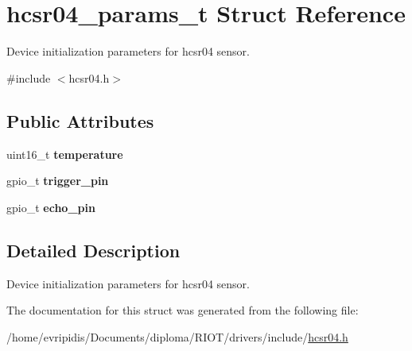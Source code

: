 \hypertarget{structhcsr04__params__t}{}\section{hcsr04\+\_\+params\+\_\+t Struct Reference}
\label{structhcsr04__params__t}


Device initialization parameters for hcsr04 sensor.  




{\ttfamily \#include $<$hcsr04.\+h$>$}

\subsection*{Public Attributes}
\begin{DoxyCompactItemize}
\item 
\mbox{\label{structhcsr04__params__t_a0323d00d2c093e609ee23964326cda6b}} 
uint16\+\_\+t {\bfseries temperature}
\item 
\mbox{\label{structhcsr04__params__t_a097d9df16ded4968dc873d1dbf73dd47}} 
gpio\+\_\+t {\bfseries trigger\+\_\+pin}
\item 
\mbox{\label{structhcsr04__params__t_a1819d40336759f6fe23b085139e7c094}} 
gpio\+\_\+t {\bfseries echo\+\_\+pin}
\end{DoxyCompactItemize}


\subsection{Detailed Description}
Device initialization parameters for hcsr04 sensor. 

The documentation for this struct was generated from the following file\+:\begin{DoxyCompactItemize}
\item 
/home/evripidis/\+Documents/diploma/\+R\+I\+O\+T/drivers/include/\hyperlink{hcsr04_8h}{hcsr04.\+h}\end{DoxyCompactItemize}
